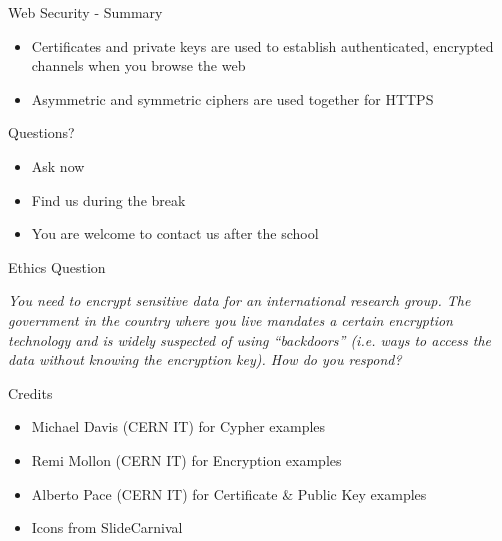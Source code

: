 \documentclass{beamer}
\begin{document}
\begin{frame}{Web Security - Summary}
\begin{itemize}
\item Certificates and private keys are used to establish authenticated, encrypted channels when you browse the web
\item Asymmetric and symmetric ciphers are used together for HTTPS
\end{itemize}
\end{frame}

\begin{frame}{Questions?}
\begin{itemize}
\item Ask now
\item Find us during the break
\item You are welcome to contact us after the school
\end{itemize}
\end{frame}

\begin{frame}{Ethics Question}
\begin{center}
\textit{You need to encrypt sensitive data for an international research group. The government in the country where you live mandates a certain encryption technology and is widely suspected of using “backdoors” (i.e. ways to access the data without knowing the encryption key). How do you respond?}
\end{center}
\end{frame}

\begin{frame}{Credits}
	\begin{itemize}
		\item Michael Davis (CERN IT) for Cypher examples
		\item Remi Mollon (CERN IT) for Encryption examples
        \item Alberto Pace (CERN IT) for Certificate \& Public Key examples
        \item Icons from SlideCarnival
	\end{itemize}
\end{frame}

\backcover
\end{document}
